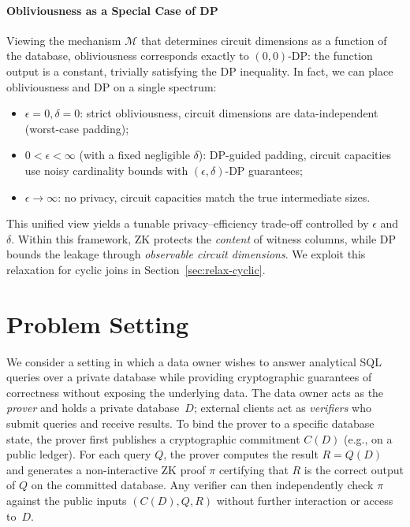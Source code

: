 \documentclass[sigconf]{acmart}
\renewcommand{\emph}[1]{\textit{#1}}
\begin{document}
\paragraph{Obliviousness as a Special Case of DP}
Viewing the mechanism $\mathcal{M}$ that determines circuit dimensions as a function of the database, obliviousness corresponds exactly to $(0,0)$-DP: the function output is a constant, trivially satisfying the DP inequality. In fact, we can place obliviousness and DP on a single spectrum:
\begin{itemize}[leftmargin=*]
    \item $\epsilon = 0, \delta = 0$: strict obliviousness, circuit dimensions are data-independent (worst-case padding);
    \item $0 < \epsilon < \infty$ (with a fixed negligible $\delta$): DP-guided padding, circuit capacities use noisy cardinality bounds with $(\epsilon,\delta)$-DP guarantees;
    \item $\epsilon \to \infty$: no privacy, circuit capacities match the true intermediate sizes.
\end{itemize}
This unified view yields a tunable privacy--efficiency trade-off controlled by $\epsilon$ and $\delta$. Within this framework, ZK protects the \emph{content} of witness columns, while DP bounds the leakage through \emph{observable circuit dimensions}. We exploit this relaxation for cyclic joins in Section~\ref{sec:relax-cyclic}.


\section{Problem Setting}
\label{sec:overview}

We consider a setting in which a data owner wishes to answer analytical SQL queries over a private database while providing cryptographic guarantees of correctness without exposing the underlying data. The data owner acts as the \emph{prover} and holds a private database~$D$; external clients act as \emph{verifiers} who submit queries and receive results. To bind the prover to a specific database state, the prover first publishes a cryptographic commitment $C(D)$ (e.g., on a public ledger). For each query $Q$, the prover computes the result $R = Q(D)$ and generates a non-interactive ZK proof $\pi$ certifying that $R$ is the correct output of $Q$ on the committed database. Any verifier can then independently check $\pi$ against the public inputs $(C(D), Q, R)$ without further interaction or access to~$D$.
\end{document}
